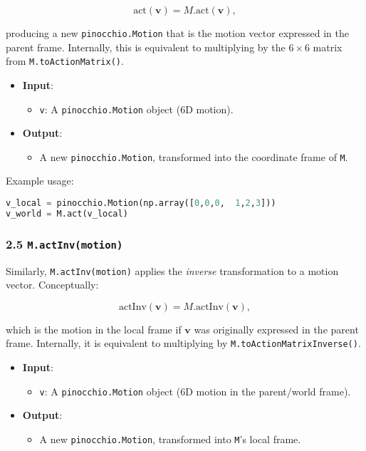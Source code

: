 \documentclass[10pt]{article}
\begin{document}
\[
\text{act}(\mathbf{v}) = M.\text{act}(\mathbf{v}),
\]

producing a new \texttt{pinocchio.Motion} that is the motion vector expressed in the parent frame. Internally, this is equivalent to multiplying by the \(6\times6\) matrix from \texttt{M.toActionMatrix()}.

\begin{itemize}
  \item \textbf{Input}:
    \begin{itemize}
      \item \texttt{v}: A \texttt{pinocchio.Motion} object (6D motion).
    \end{itemize}
  \item \textbf{Output}:
    \begin{itemize}
      \item A new \texttt{pinocchio.Motion}, transformed into the coordinate frame of \texttt{M}.
    \end{itemize}
\end{itemize}

Example usage:
\begin{lstlisting}[language=Python]
v_local = pinocchio.Motion(np.array([0,0,0,  1,2,3]))
v_world = M.act(v_local)
\end{lstlisting}

\subsubsection*{2.5 \texttt{M.actInv(motion)}}

Similarly, \texttt{M.actInv(motion)} applies the \emph{inverse} transformation to a motion vector. Conceptually:

\[
\text{actInv}(\mathbf{v}) = M.\text{actInv}(\mathbf{v}),
\]

which is the motion in the local frame if \(\mathbf{v}\) was originally expressed in the parent frame. Internally, it is equivalent to multiplying by \texttt{M.toActionMatrixInverse()}.

\begin{itemize}
  \item \textbf{Input}:
    \begin{itemize}
      \item \texttt{v}: A \texttt{pinocchio.Motion} object (6D motion in the parent/world frame).
    \end{itemize}
  \item \textbf{Output}:
    \begin{itemize}
      \item A new \texttt{pinocchio.Motion}, transformed into \texttt{M}'s local frame.
    \end{itemize}
\end{itemize}
\end{document}
